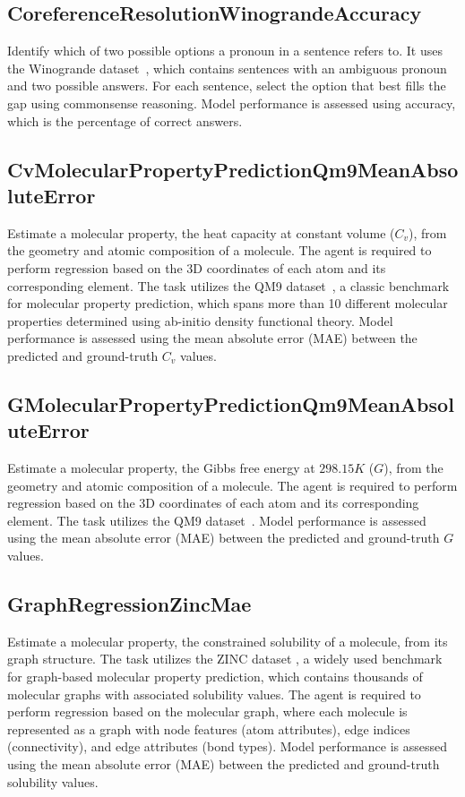 \documentclass{fairmeta}
\begin{document}
\subsection{CoreferenceResolutionWinograndeAccuracy}

Identify which of two possible options a pronoun in a sentence refers to. It uses the Winogrande dataset~\citep{sakaguchi2021winogrande}, which contains sentences with an ambiguous pronoun and two possible answers. For each sentence, select the option that best fills the gap using commonsense reasoning. Model performance is assessed using accuracy, which is the percentage of correct answers.


\subsection{CvMolecularPropertyPredictionQm9MeanAbsoluteError}

Estimate a molecular property, the heat capacity at constant volume ($C_v$), from the geometry and atomic composition of a molecule. The agent is required to perform regression based on the 3D coordinates of each atom and its corresponding element. The task utilizes the QM9 dataset~\citep{ramakrishnan2014quantum}, a classic benchmark for molecular property prediction, which spans more than 10 different molecular properties determined using ab-initio density functional theory. Model performance is assessed using the mean absolute error (MAE) between the predicted and ground-truth $C_v$ values.


\subsection{GMolecularPropertyPredictionQm9MeanAbsoluteError}

Estimate a molecular property, the Gibbs free energy at $298.15$$K$  ($G$), from the geometry and atomic composition of a molecule. The agent is required to perform regression based on the 3D coordinates of each atom and its corresponding element. The task utilizes the QM9 dataset~\citep{ramakrishnan2014quantum}. Model performance is assessed using the mean absolute error (MAE) between the predicted and ground-truth $G$ values.


\subsection{GraphRegressionZincMae}

Estimate a molecular property, the constrained solubility of a molecule, from its graph structure. The task utilizes the ZINC dataset \citep{sterling2015zinc}, a widely used benchmark for graph-based molecular property prediction, which contains thousands of molecular graphs with associated solubility values. The agent is required to perform regression based on the molecular graph, where each molecule is represented as a graph with node features (atom attributes), edge indices (connectivity), and edge attributes (bond types).  Model performance is assessed using the mean absolute error (MAE) between the predicted and ground-truth solubility values.
\end{document}
